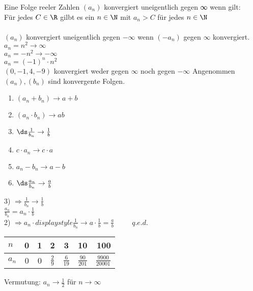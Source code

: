 %
\setcounter{chapter}{3}
\setcounter{section}{9}
%
\wdh
Eine Folge reeler Zahlen $(a_n)$ konvergiert uneigentlich gegen ∞ wenn gilt:\\
Für jedes $C \in \R$ gilbt es ein $n \in\N$ mit $a_n > C$ für jedes $n \in\N$\\
\\
$(a_n)$ konvergiert uneigentlich gegen $- \infty$ wenn $(-a_n)$ gegen $\infty$ konvergiert.\\
%
%
\bsp
$a_n = n^2 \to \infty$\\
$a_n = -n^2 \to -\infty$\\
$a_n = (-1)^n \cdot n^2$\\
$(0, -1, 4, -9)$ konvergiert weder gegen $\infty$ noch gegen $ - \infty$
%
Angenommen $(a_n), (b_n)$ sind konvergente Folgen.\\
\begin{enumerate}
\item{$(a_n + b_n) \to a + b$}
\item{$(a_n \cdot b_n) \to ab$}
\item{$\ds\frac{1}{b_n} \to \frac{1}{b}$}
\item{$c \cdot a_n \to c \cdot a$}
\item{$a_n - b_n \to a - b$}
\item{$\ds\frac{a_n}{b_n} \to \frac{a}{b}$}
\end{enumerate}
%
3) $\Rightarrow \displaystyle\frac{1}{b_n} \to \displaystyle\frac{1}{b}$\\
$\displaystyle\frac{a_n}{b_n} = a_n \cdot \displaystyle\frac{1}{b}$\\
2) $\Rightarrow a_n \cdot displaystyle\frac{1}{b_n} \to a \cdot \displaystyle\frac{1}{b} = \displaystyle\frac{a}{b} \phantom{XXX} q.e.d.$\\
%
\bsp
\begin{tabular}{l|c|c|c|c|c|r}
$n$   & 0 & 1 & 2 & 3 & 10 & 100\\\hline
$a_n$ & 0 & 0 & $\frac{2}{9}$ & $\frac{6}{19}$ & $\frac{90}{201}$ & $\frac{9900}{20001}$ \\
\end{tabular}
\vspace{5mm}
Vermutung: $a_n \to \displaystyle\frac{1}{2}$ für $n \to \infty$\\

